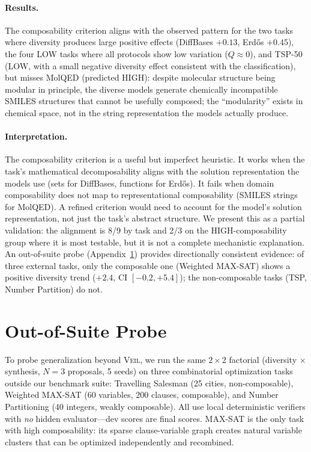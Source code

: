 \documentclass{article}
\begin{document}
\paragraph{Results.}
The composability criterion aligns with the observed pattern for the two tasks where diversity produces large positive effects (DiffBases $+0.13$, Erd\H{o}s $+0.45$), the four LOW tasks where all protocols show low variation ($Q \approx 0$), and TSP-50 (LOW, with a small negative diversity effect consistent with the classification), but misses MolQED (predicted HIGH): despite molecular structure being modular in principle, the diverse models generate chemically incompatible SMILES structures that cannot be usefully composed; the ``modularity'' exists in chemical space, not in the string representation the models actually produce.

\paragraph{Interpretation.}
The composability criterion is a useful but imperfect heuristic. It works when the task's mathematical decomposability aligns with the solution representation the models use (sets for DiffBases, functions for Erd\H{o}s). It fails when domain composability does not map to representational composability (SMILES strings for MolQED). A refined criterion would need to account for the model's solution representation, not just the task's abstract structure. We present this as a partial validation: the alignment is 8/9 by task and 2/3 on the HIGH-composability group where it is most testable, but it is not a complete mechanistic explanation. An out-of-suite probe (Appendix~\ref{app:external}) provides directionally consistent evidence: of three external tasks, only the composable one (Weighted MAX-SAT) shows a positive diversity trend ($+2.4$, CI $[-0.2, +5.4]$); the non-composable tasks (TSP, Number Partition) do not.

\section{Out-of-Suite Probe}
\label{app:external}

To probe generalization beyond \textsc{Veil}, we run the same $2{\times}2$ factorial (diversity $\times$ synthesis, $N{=}3$ proposals, 5 seeds) on three combinatorial optimization tasks outside our benchmark suite: Travelling Salesman (25 cities, non-composable), Weighted MAX-SAT (60 variables, 200 clauses, composable), and Number Partitioning (40 integers, weakly composable). All use local deterministic verifiers with \emph{no} hidden evaluator---dev scores are final scores. MAX-SAT is the only task with high composability: its sparse clause-variable graph creates natural variable clusters that can be optimized independently and recombined.
\end{document}
